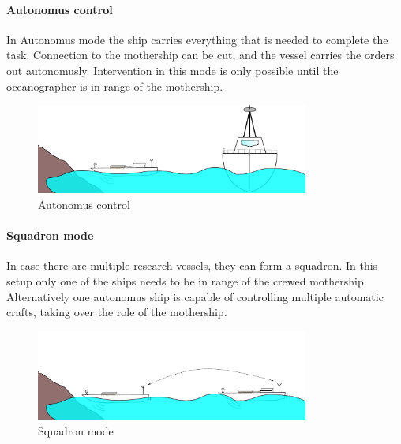 \paragraph{Autonomus control}
In Autonomus mode the ship carries everything that is needed to complete the task. Connection to the mothership can be cut, and the vessel carries the orders out autonomusly. Intervention in this mode is only possible until the oceanographer is in range of the mothership.

\begin{figure}[H]
	\centering
	\includegraphics[width=0.8\textwidth]{img/autonomus}
	\caption{Autonomus control}
	\label{fig:autonomus}
\end{figure}

\paragraph{Squadron mode}
In case there are multiple research vessels, they can form a squadron. In this setup only one of the ships needs to be in range of the crewed mothership. Alternatively one autonomus ship is capable of controlling multiple automatic crafts, taking over the role of the mothership.

\begin{figure}[H]
	\centering
	\includegraphics[width=0.8\textwidth]{img/multiple}
	\caption{Squadron mode}
	\label{fig:multiple}
\end{figure}

